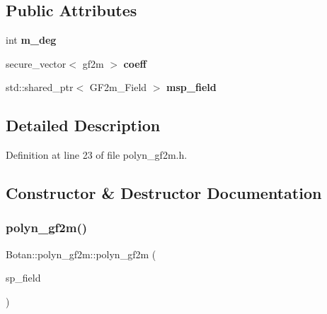 \subsection*{Public Attributes}
\begin{DoxyCompactItemize}
\item 
\mbox{\label{class_botan_1_1polyn__gf2m_a1594e365b08693d7b92e00dd85503210}} 
int {\bfseries m\+\_\+deg}
\item 
\mbox{\label{class_botan_1_1polyn__gf2m_abdbc745672cea1211b4da685fad3c4cf}} 
secure\+\_\+vector$<$ gf2m $>$ {\bfseries coeff}
\item 
\mbox{\label{class_botan_1_1polyn__gf2m_a1b49fc3754b54131a894bc4dc288595d}} 
std\+::shared\+\_\+ptr$<$ G\+F2m\+\_\+\+Field $>$ {\bfseries msp\+\_\+field}
\end{DoxyCompactItemize}


\subsection{Detailed Description}


Definition at line 23 of file polyn\+\_\+gf2m.\+h.



\subsection{Constructor \& Destructor Documentation}
\mbox{\label{class_botan_1_1polyn__gf2m_ae99780249cace1fef68912738bd83497}} 
\subsubsection{\texorpdfstring{polyn\+\_\+gf2m()}{polyn\_gf2m()}\hspace{0.1cm}{\footnotesize\ttfamily [1/5]}}
{\footnotesize\ttfamily Botan\+::polyn\+\_\+gf2m\+::polyn\+\_\+gf2m (\begin{DoxyParamCaption}\item[{std\+::shared\+\_\+ptr$<$ G\+F2m\+\_\+\+Field $>$}]{sp\+\_\+field }\end{DoxyParamCaption})\hspace{0.3cm}{\ttfamily [explicit]}}

